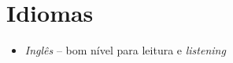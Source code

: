 \section{Idiomas}
\begin{itemize}
	\item \emph{Inglês} -- bom nível para leitura e \emph{listening}
\end{itemize}
